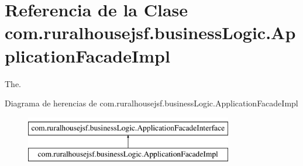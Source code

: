 \hypertarget{a00132}{}\section{Referencia de la Clase com.\+ruralhousejsf.\+business\+Logic.\+Application\+Facade\+Impl}
\label{a00132}


The.  


Diagrama de herencias de com.\+ruralhousejsf.\+business\+Logic.\+Application\+Facade\+Impl\begin{figure}[H]
\begin{center}
\leavevmode
\includegraphics[height=2.000000cm]{a00132}
\end{center}
\end{figure}
